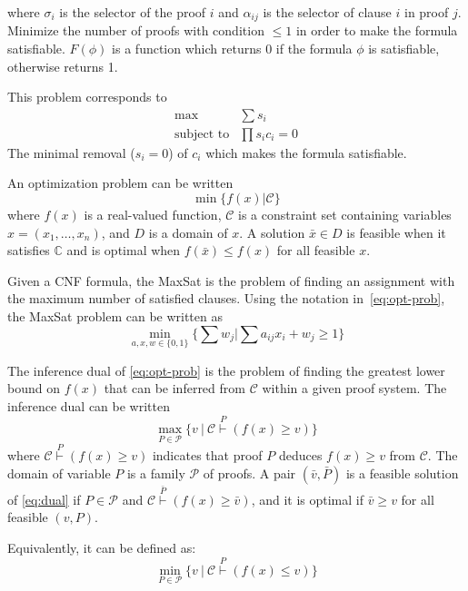 \documentclass[runningheads,a4paper]{llncs}
\begin{document}
where $\sigma_i$ is the selector of the proof $i$ and $\alpha_{ij}$ is the
selector of clause $i$ in proof $j$.
Minimize the number of proofs with condition $\le 1$ in order to make
the formula satisfiable.
$F( \phi  )$ is a function which returns 0 if the formula $\phi$ is
satisfiable, otherwise returns 1.

This problem corresponds to 
\begin{eqnarray}
\max & \sum s_i \\
\text{subject to} & \prod s_i c_i = 0
\end{eqnarray}
The minimal removal ($s_i = 0$) of $c_i$ which makes the formula satisfiable.

An optimization problem can be written 
\begin{equation}
\min \{ f(x) | \mathcal{C} \}
\label{eq:opt-prob}
\end{equation}
where $f(x)$ is a real-valued function, $\mathcal{C}$ is a constraint set containing variables $x=(x_1, \ldots, x_n)$, and $D$ is a domain of $x$. A solution $\bar x\in D$ is feasible when it satisfies $\mathbb{C}$ and is optimal when $f(\bar x) \le f(x)$ for all feasible $x$.

Given a CNF formula, the MaxSat is the problem of finding an assignment with the maximum number of satisfied clauses.
Using the notation in~\ref{eq:opt-prob}, the MaxSat problem can be written as
\begin{equation}
\min_{a,x,w\in \{ 0, 1 \}} \{ \sum w_j | \sum a_{ij} x_i + w_j  \ge 1 \}
\label{eq:maxsat}
\end{equation}

The inference dual of \ref{eq:opt-prob} is the problem of finding the greatest lower bound on $f(x)$ that can be inferred from $\mathcal{C}$ within a given proof system. The inference dual can be written
\begin{equation}
\max_{P\in \mathcal{P}} \{ v\ |\ \mathcal{C} \overset{P}{\vdash} (f(x) \ge v) \}
\label{eq:dual}
\end{equation}
where $\mathcal{C} \overset{P}{\vdash} (f(x) \ge v)$ indicates that proof $P$ deduces $f(x) \ge v$ from $\mathcal{C}$. The domain of variable $P$ is a family $\mathcal{P}$ of proofs. A pair $(\bar v, \bar P)$ is a feasible solution of \ref{eq:dual} if $P\in\mathcal{P}$ and $\mathcal{C} \overset{\bar P}{\vdash} (f(x) \ge \bar v)$, and it is optimal if $\bar v \ge v$ for all feasible $(v,P)$.

Equivalently, it can be defined as:
\begin{equation}
\min_{P\in \mathcal{P}} \{ v\ |\ \mathcal{C} \overset{P}{\vdash} (f(x) \le v) \}
\label{eq:dual2}
\end{equation}
\end{document}
